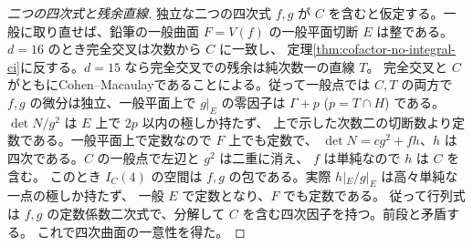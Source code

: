 \begin{proof}[二つの四次式と残余直線]
独立な二つの四次式 $f,g$ が $C$ を含むと仮定する。一般に取り直せば、鉛筆の一般曲面
$F=V(f)$ の一般平面切断 $E$ は整である。$d=16$ のとき完全交叉は次数から $C$ に一致し、
定理\ref{thm:cofactor-no-integral-ci}に反する。$d=15$ なら完全交叉での残余は純次数一の直線 $T$。
完全交叉と $C$ がともにCohen--Macaulayであることによる。従って一般点では $C,T$ の両方で
$f,g$ の微分は独立、一般平面上で $g|_E$ の零因子は $\Gamma+p$ ($p=T\cap H$) である。
$\det N/g^2$ は $E$ 上で $2p$ 以内の極しか持たず、
上で示した次数二の切断数より定数である。一般平面上で定数なので $F$ 上でも定数で、
$\det N= c g^2+f h$、$h$ は四次である。$C$ の一般点で左辺と $g^2$ は二重に消え、
$f$ は単純なので $h$ は $C$ を含む。
このとき $I_C(4)$ の空間は $f,g$ の包である。実際 $h|_E/g|_E$ は高々単純な一点の極しか持たず、
一般 $E$ で定数となり、$F$ でも定数である。
従って行列式は $f,g$ の定数係数二次式で、分解して $C$ を含む四次因子を持つ。前段と矛盾する。
これで四次曲面の一意性を得た。
\end{proof}

